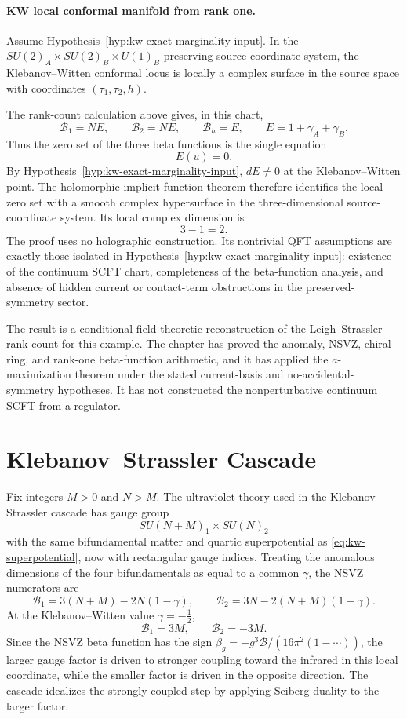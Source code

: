 \paragraph{KW local conformal manifold from rank one.}
Assume Hypothesis~\ref{hyp:kw-exact-marginality-input}.  In the
\(SU(2)_A\times SU(2)_B\times U(1)_B\)-preserving source-coordinate system, the
Klebanov--Witten conformal locus is locally a complex surface in the
source space with coordinates \((\tau_1,\tau_2,h)\).

The rank-count calculation above gives, in this chart,
\[
  \mathcal B_1=N E,\qquad
  \mathcal B_2=N E,\qquad
  \mathcal B_h=E,
  \qquad
  E=1+\gamma_A+\gamma_B .
\]
Thus the zero set of the three beta functions is the single equation
\[
  E(u)=0 .
\]
By Hypothesis~\ref{hyp:kw-exact-marginality-input}, \(dE\neq0\) at the
Klebanov--Witten point.  The holomorphic implicit-function theorem therefore
identifies the local zero set with a smooth complex hypersurface in the
three-dimensional source-coordinate system.  Its local complex dimension is
\[
  3-1=2 .
\]
The proof uses no holographic construction.  Its nontrivial QFT assumptions
are exactly those isolated in
Hypothesis~\ref{hyp:kw-exact-marginality-input}: existence of the continuum
SCFT chart, completeness of the beta-function analysis, and absence of hidden
current or contact-term obstructions in the preserved-symmetry sector.

The result is a conditional field-theoretic reconstruction of the
Leigh--Strassler rank count for this example.  The chapter has proved the
anomaly, NSVZ, chiral-ring, and rank-one beta-function arithmetic, and it has
applied the \(a\)-maximization theorem under the stated current-basis and
no-accidental-symmetry hypotheses.  It has not constructed the
nonperturbative continuum SCFT from a regulator.

\section{Klebanov--Strassler Cascade}
\label{sec:n1-klebanov-strassler-cascade}

Fix integers \(M>0\) and \(N>M\).  The ultraviolet theory used in the
Klebanov--Strassler cascade has gauge group
\[
  SU(N+M)_1\times SU(N)_2
\]
with the same bifundamental matter and quartic superpotential as
\eqref{eq:kw-superpotential}, now with rectangular gauge indices.  Treating
the anomalous dimensions of the four bifundamentals as equal to a common
\(\gamma\), the NSVZ numerators are
\begin{equation}
  \mathcal B_1
  =
  3(N+M)-2N(1-\gamma),
  \qquad
  \mathcal B_2
  =
  3N-2(N+M)(1-\gamma).
  \label{eq:ks-nsvz-numerators}
\end{equation}
At the Klebanov--Witten value \(\gamma=-\frac12\),
\[
  \mathcal B_1=3M,\qquad
  \mathcal B_2=-3M .
\]
Since the NSVZ beta function has the sign
\(\beta_g=-g^3\mathcal B/(16\pi^2(1-\cdots))\), the larger gauge factor is
driven to stronger coupling toward the infrared in this local coordinate,
while the smaller factor is driven in the opposite direction.  The cascade
idealizes the strongly coupled step by applying Seiberg duality to the
larger factor.

